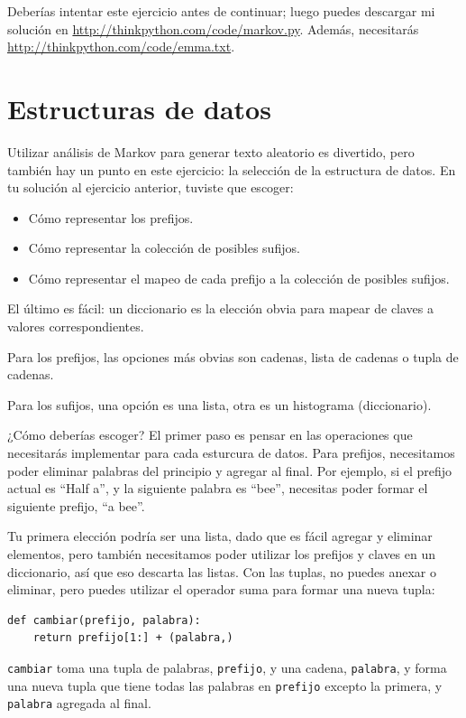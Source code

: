 \documentclass[10pt]{book}
\begin{document}
Deberías intentar este ejercicio antes de continuar; luego puedes
descargar mi solución en \url{http://thinkpython.com/code/markov.py}.
Además, necesitarás \url{http://thinkpython.com/code/emma.txt}.


\section{Estructuras de datos}

Utilizar análisis de Markov para generar texto aleatorio es divertido, pero también
hay un punto en este ejercicio: la selección de la estructura de datos.  En tu
solución al ejercicio anterior, tuviste que escoger:

\begin{itemize}

\item Cómo representar los prefijos.

\item Cómo representar la colección de posibles sufijos.

\item Cómo representar el mapeo de cada prefijo a
la colección de posibles sufijos.

\end{itemize}

El último es fácil: un diccionario es la elección obvia
para mapear de claves a valores correspondientes.

Para los prefijos, las opciones más obvias son cadenas,
lista de cadenas o tupla de cadenas.

Para los sufijos,
una opción es una lista, otra es un histograma (diccionario).

¿Cómo deberías escoger?  El primer paso es pensar en
las operaciones que necesitarás implementar para cada esturcura de datos.
Para prefijos, necesitamos poder eliminar palabras del
principio y agregar al final.  Por ejemplo, si el prefijo actual
es ``Half a'', y la siguiente palabra es ``bee'', necesitas
poder formar el siguiente prefijo, ``a bee''.

Tu primera elección podría ser una lista, dado que es fácil agregar y
eliminar elementos, pero también necesitamos poder utilizar los
prefijos y claves en un diccionario, así que eso descarta las listas.
Con las tuplas, no puedes anexar o eliminar, pero puedes utilizar
el operador suma para formar una nueva tupla:

\begin{verbatim}
def cambiar(prefijo, palabra):
    return prefijo[1:] + (palabra,)
\end{verbatim}
%
{\tt cambiar} toma una tupla de palabras, {\tt prefijo}, y una cadena,
{\tt palabra}, y forma una nueva tupla que tiene todas las palabras
en {\tt prefijo} excepto la primera, y {\tt palabra} agregada al
final.
\end{document}

